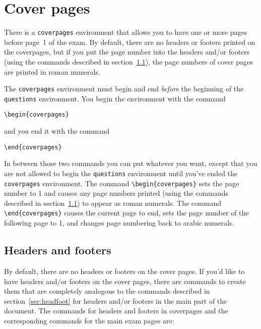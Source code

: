 \documentclass[12pt]{exam}
\begin{document}
\section{Cover pages}
\label{sec:coverpages}


There is a \verb"coverpages" environment that allows you to have one
or more pages before page~1 of the exam.  By default, there are no
headers or footers printed on the coverpages, but if you put the page
number into the headers and/or footers (using the commands described
in section~\ref{sec:Coverhdft}), the page numbers of cover pages are
printed in roman numerals.

The \verb"coverpages" environment must begin and end \emph{before} the
beginning of the \verb"questions" environment.  You begin the
environment with the command
\begin{center}
  \verb"\begin{coverpages}"
\end{center}
and you end it with the command
\begin{center}
  \verb"\end{coverpages}"
\end{center}
In between those two commands you can put whatever you want, except
that you are not allowed to begin the \verb"questions" environment
until you've ended the \verb"coverpages" environment.  The command
\verb"\begin{coverpages}" sets the page number to 1 and causes any
page numbers printed (using the commands described in
section~\ref{sec:Coverhdft}) to appear as roman numerals.  The command
\verb"\end{coverpages}" causes the current page to end, sets the page
number of the following page to 1, and changes page numbering back to
arabic numerals.

\subsection{Headers and footers}
\label{sec:Coverhdft}

By default, there are no headers or footers on the cover pages.  If
you'd like to have headers and/or footers on the cover pages, there
are commands to create them that are completely analogous to the
commands described in section~\ref{sec:headfoot} for headers and/or
footers in the main part of the document.  The commands for headers
and footers in coverpages and the corresponding commands for the main
exam pages are:
\end{document}
